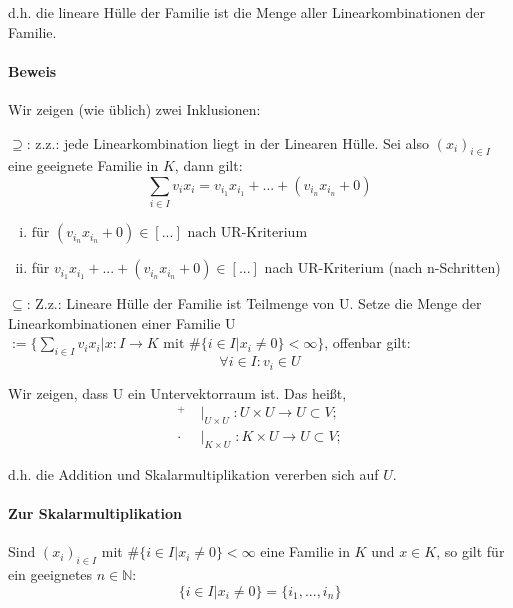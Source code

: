 	d.h. die lineare Hülle der Familie ist die Menge aller Linearkombinationen der Familie.

\paragraph{Beweis}
	Wir zeigen (wie üblich) zwei Inklusionen:	

	$\supseteq$: z.z.: jede Linearkombination liegt in der Linearen Hülle. Sei also $(x_i)_{i\in I}$ eine geeignete Familie in $ K $, dann gilt:
	\begin{equation*}
		\sum_{i\in I} v_i x_i = v_{i_1} x_{i_1} + ... + (v_{i_n}x_{i_n}+0)
	\end{equation*}

	\begin{enumerate}[(i)]
		\item $\text{für } (v_{i_n}x_{i_n}+0) \in [...] \text{ nach UR-Kriterium}$
		\item für $v_{i_1}x_{i_1} + ... + (v_{i_n}x_{i_n}+0) \in [...]$ nach UR-Kriterium (nach n-Schritten)
	\end{enumerate}

	$\subseteq$: Z.z.: Lineare Hülle der Familie ist Teilmenge von U. Setze die Menge der Linearkombinationen einer Familie U $:= \{{\sum_{i\in I} v_ix_i| x: I\to K \text{ mit } \#\{{i\in I| x_i \neq 0\}} < \infty\}}$, offenbar gilt:
	\begin{equation*}
		\forall i\in I: v_i\in U
	\end{equation*}

	Wir zeigen, dass U ein Untervektorraum ist. Das heißt,
	\begin{align*}
	^+    & \mid_{U\times U}: U\times U \to U \subset V;\\
	\cdot & \mid_{K\times U}: K\times U \to U \subset V;
	\end{align*}
	
	d.h. die Addition und Skalarmultiplikation vererben sich auf $ U $.

\paragraph{Zur Skalarmultiplikation}
	Sind $(x_i)_{i\in I}$ mit $\#\{i\in I| x_i \neq 0\}<\infty$ eine Familie in $ K $ und $x\in K$, so gilt für ein geeignetes $n\in \mathbb{N}$:
	\begin{equation*}
		\{i\in I| x_i \neq 0\} = \{i_1, ... , i_n\}
	\end{equation*}

